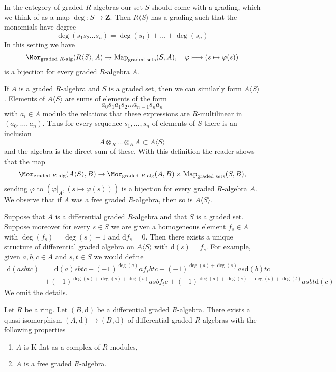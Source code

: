 \medskip\noindent
In the category of graded $R$-algebras our set $S$ should come
with a grading, which we think of as a map $\deg : S \to \mathbf{Z}$.
Then $R\langle S\rangle$ has a grading such that the monomials
have degree
$$
\deg(s_1 s_2 \ldots s_n) = \deg(s_1) + \ldots + \deg(s_n)
$$
In this setting we have
$$
\Mor_{\text{graded }R\text{-alg}}(R\langle S \rangle, A) \to
\text{Map}_{\text{graded sets}}(S, A),\quad
\varphi \longmapsto (s \mapsto \varphi(s))
$$
is a bijection for every graded $R$-algebra $A$.

\medskip\noindent
If $A$ is a graded $R$-algebra and $S$ is a graded set,
then we can similarly form $A\langle S \rangle$.
Elements of $A\langle S \rangle$ are
sums of elements of the form
$$
a_0 s_1 a_1 s_2 \ldots a_{n - 1} s_n a_n
$$
with $a_i \in A$ modulo the relations that these expressions
are $R$-multilinear in $(a_0, \ldots, a_n)$.
Thus for every sequence $s_1, \ldots, s_n$ of elements of $S$
there is an inclusion
$$
A \otimes_R \ldots \otimes_R A \subset A\langle S \rangle
$$
and the algebra is the direct sum of these. With this definition the
reader shows that the map
$$
\Mor_{\text{graded }R\text{-alg}}(A\langle S \rangle, B) \to
\Mor_{\text{graded }R\text{-alg}}(A, B) \times
\text{Map}_{\text{graded sets}}(S, B),
$$
sending $\varphi$ to $(\varphi|_A, (s \mapsto \varphi(s)))$
is a bijection for every graded $R$-algebra $A$.
We observe that if $A$ was a free graded $R$-algebra,
then so is $A\langle S \rangle$.

\medskip\noindent
Suppose that $A$ is a differential graded $R$-algebra and
that $S$ is a graded set. Suppose moreover for every $s \in S$
we are given a homogeneous element $f_s \in A$ with $\deg(f_s) = \deg(s) + 1$
and $\text{d}f_s = 0$. Then there exists a unique structure of
differential graded algebra on $A\langle S \rangle$ with
$\text{d}(s) = f_s$. For example, given $a, b, c \in A$ and
$s, t \in S$ we would define
\begin{align*}
\text{d}(asbtc)
& =
\text{d}(a)sbtc + (-1)^{\deg(a)}a f_s b t c +
(-1)^{\deg(a) + \deg(s)} as\text{d}(b)tc \\
& + (-1)^{\deg(a) + \deg(s) + \deg(b)} asb f_t c +
(-1)^{\deg(a) + \deg(s) + \deg(b) + \deg(t)} asbt\text{d}(c)
\end{align*}
We omit the details.

\begin{lemma}
\label{lemma-K-flat-resolution}
Let $R$ be a ring. Let $(B, \text{d})$ be a differential graded $R$-algebra.
There exists a quasi-isomorphism $(A, \text{d}) \to (B, \text{d})$ of
differential graded $R$-algebras with the following properties
\begin{enumerate}
\item $A$ is K-flat as a complex of $R$-modules,
\item $A$ is a free graded $R$-algebra.
\end{enumerate}
\end{lemma}

